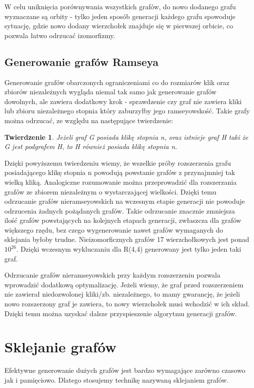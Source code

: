 \documentclass[11pt]{article}
\newtheorem{theorem}{Twierdzenie}
\begin{document}
W celu uniknięcia porównywania wszystkich grafów, do nowo dodanego grafu wyznaczane są orbity - tylko jeden sposób generacji każdego grafu spowoduje sytuację, gdzie nowo dodany wierzchołek znajduje się w pierwszej orbicie, co pozwala łatwo odrzucać izomorfizmy.

   \subsection{Generowanie grafów Ramseya}
   Generowanie grafów obarczonych ograniczeniami co do rozmiarów klik oraz zbiorów niezależnych wygląda niemal tak samo jak generowanie grafów dowolnych, 
   ale zawiera dodatkowy krok - sprawdzenie czy graf nie zawiera kliki lub zbioru niezależnego stopnia który zaburzyłby jego ramseyowskość. Takie grafy można odrzucać, ze względu na następujące twierdzenie:
     \begin{theorem}
      Jeżeli graf G posiada klikę stopnia n, oraz istnieje graf H taki że G jest podgrafem H, to H również posiada klikę stopnia n.
   \end{theorem}
  Dzięki powyższemu twierdzeniu wiemy, że wszelkie próby rozszerzenia grafu posiadającego klikę stopnia n powodują powstanie grafów z przynajmniej tak wielką kliką. Analogiczne rozumowanie można przeprowadzić dla rozszerzania grafów ze zbiorem niezależnym o wystarczającej wielkości. Dzięki temu odrzucanie grafów nieramseyowskich na wczesnym etapie generacji nie powoduje odrzucenia żadnych pożądanych grafów. Takie odrzucanie znacznie zmniejsza ilość grafów powstających na kolejnych etapach generacji, zwłaszcza dla grafów większego rzędu, bez czego wygenerowanie nawet grafów wymaganych do sklejania byłoby trudne. Nieizomorficznych grafów 17 wierzchołkowych jest ponad $10^{26}$.\cite{OEIS} Dzięki wczesnym wykluczaniu dla R(4,4) generowany jest tylko jeden taki graf. 
  
Odrzucanie grafów nieramseyowskich przy każdym rozszerzeniu pozwala wprowadzić dodatkową optymalizację. Jeżeli wiemy, że graf przed rozszerzeniem nie zawierał niedozwolonej kliki/zb. niezależnego, to mamy gwarancję, że jeżeli nowo rozszerzony graf je zawiera, to nowy wierzchołek musi wchodzić w ich skład. Dzięki temu można uzyskać dalsze przyspieszenie algorytmu generacji grafów.


\section{Sklejanie grafów}
Efektywne generowanie dużych grafów jest bardzo wymagające zarówno czasowo jak i pamięciowo. Dlatego stosujemy technikę nazywaną sklejaniem grafów. 
\end{document}
